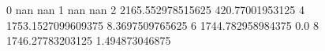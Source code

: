 0 nan nan
1 nan nan
2 2165.552978515625 420.77001953125
4 1753.1527099609375 8.3697509765625
6 1744.782958984375 0.0
8 1746.27783203125 1.494873046875
